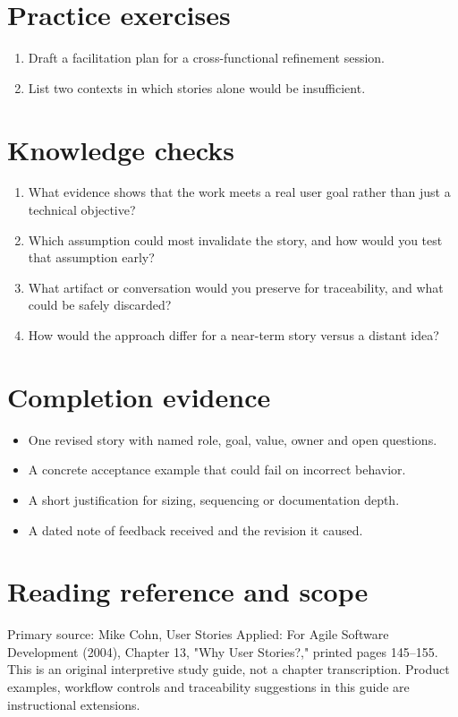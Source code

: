 \documentclass[11pt,letterpaper]{article}
\begin{document}
\section{Practice exercises}
\begin{enumerate}[leftmargin=*,itemsep=3pt]
\item Draft a facilitation plan for a cross-functional refinement session.
\item List two contexts in which stories alone would be insufficient.
\end{enumerate}
\section{Knowledge checks}
\begin{enumerate}[leftmargin=*,itemsep=3pt]
\item What evidence shows that the work meets a real user goal rather than just a technical objective?
\item Which assumption could most invalidate the story, and how would you test that assumption early?
\item What artifact or conversation would you preserve for traceability, and what could be safely discarded?
\item How would the approach differ for a near-term story versus a distant idea?
\end{enumerate}
\section{Completion evidence}
\begin{itemize}[leftmargin=*,itemsep=2pt]
\item One revised story with named role, goal, value, owner and open questions.
\item A concrete acceptance example that could fail on incorrect behavior.
\item A short justification for sizing, sequencing or documentation depth.
\item A dated note of feedback received and the revision it caused.
\end{itemize}
\section{Reading reference and scope}
Primary source: Mike Cohn, User Stories Applied: For Agile Software Development (2004), Chapter 13, "Why User Stories?," printed pages 145–155. This is an original interpretive study guide, not a chapter transcription. Product examples, workflow controls and traceability suggestions in this guide are instructional extensions.
\end{document}
